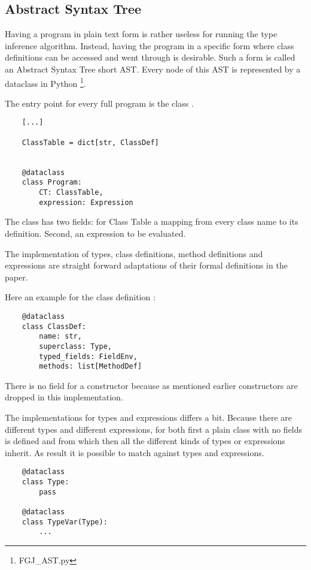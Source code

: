 \subsection{Abstract Syntax Tree}

Having a program in plain text form is rather useless for running the type inference algorithm. Instead, having the program in a specific form where class definitions can be accessed and went through is desirable.
Such a form is called an Abstract Syntax Tree short AST. Every node of this AST is represented by a dataclass in Python \footnote{FGJ\_AST.py}.

The entry point for every full program is the class .
\begin{verbatim}
    [...]

    ClassTable = dict[str, ClassDef]


    @dataclass
    class Program:
        CT: ClassTable,
        expression: Expression
\end{verbatim}

The class  has two fields:  for Class Table a mapping from every class name to its definition. Second,  an expression to be evaluated.

The implementation of types, class definitions, method definitions and expressions are straight forward adaptations of their formal definitions in the paper.

Here an example for the class definition :
\begin{verbatim}
    @dataclass
    class ClassDef:
        name: str,
        superclass: Type,
        typed_fields: FieldEnv,
        methods: list[MethodDef]
\end{verbatim}

There is no field for a constructor because as mentioned earlier constructors are dropped in this implementation.

The implementations for types and expressions differs a bit. Because there are different types and different expressions, for both first a plain class with no fields is defined  and  from which then all the different kinds of types or expressions inherit.
As result it is possible to match against types and expressions.

\begin{verbatim}
    @dataclass
    class Type:
        pass

    @dataclass
    class TypeVar(Type):
        ...
\end{verbatim}

